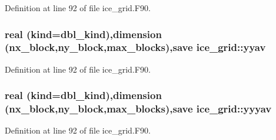 Definition at line 92 of file ice\_\-grid.F90.\hypertarget{namespaceice__grid_ae982b98ad7bfa759bb9a1da9dd749783}{
\subsubsection[{yyav}]{\setlength{\rightskip}{0pt plus 5cm}real (kind=dbl\_\-kind),dimension (nx\_\-block,ny\_\-block,max\_\-blocks),save {\bf ice\_\-grid::yyav}}}
\label{namespaceice__grid_ae982b98ad7bfa759bb9a1da9dd749783}


Definition at line 92 of file ice\_\-grid.F90.\hypertarget{namespaceice__grid_a9ed5ccbe07d1272b819d05221f756b06}{
\subsubsection[{yyyav}]{\setlength{\rightskip}{0pt plus 5cm}real (kind=dbl\_\-kind),dimension (nx\_\-block,ny\_\-block,max\_\-blocks),save {\bf ice\_\-grid::yyyav}}}
\label{namespaceice__grid_a9ed5ccbe07d1272b819d05221f756b06}


Definition at line 92 of file ice\_\-grid.F90.